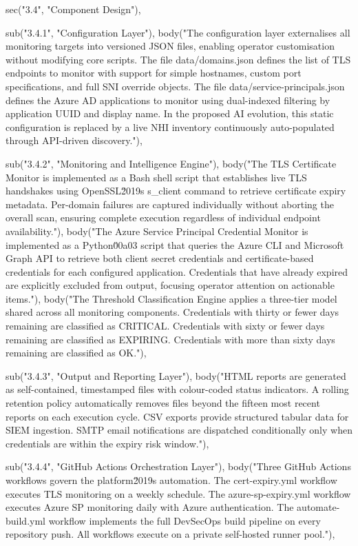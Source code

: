   sec("3.4", "Component Design"),

  sub("3.4.1", "Configuration Layer"),
  body("The configuration layer externalises all monitoring targets into versioned JSON files, enabling operator customisation without modifying core scripts. The file data/domains.json defines the list of TLS endpoints to monitor with support for simple hostnames, custom port specifications, and full SNI override objects. The file data/service-principals.json defines the Azure AD applications to monitor using dual-indexed filtering by application UUID and display name. In the proposed AI evolution, this static configuration is replaced by a live NHI inventory continuously auto-populated through API-driven discovery."),

  sub("3.4.2", "Monitoring and Intelligence Engine"),
  body("The TLS Certificate Monitor is implemented as a Bash shell script that establishes live TLS handshakes using OpenSSL\u2019s s_client command to retrieve certificate expiry metadata. Per-domain failures are captured individually without aborting the overall scan, ensuring complete execution regardless of individual endpoint availability."),
  body("The Azure Service Principal Credential Monitor is implemented as a Python\u00a03 script that queries the Azure CLI and Microsoft Graph API to retrieve both client secret credentials and certificate-based credentials for each configured application. Credentials that have already expired are explicitly excluded from output, focusing operator attention on actionable items."),
  body("The Threshold Classification Engine applies a three-tier model shared across all monitoring components. Credentials with thirty or fewer days remaining are classified as CRITICAL. Credentials with sixty or fewer days remaining are classified as EXPIRING. Credentials with more than sixty days remaining are classified as OK."),

  sub("3.4.3", "Output and Reporting Layer"),
  body("HTML reports are generated as self-contained, timestamped files with colour-coded status indicators. A rolling retention policy automatically removes files beyond the fifteen most recent reports on each execution cycle. CSV exports provide structured tabular data for SIEM ingestion. SMTP email notifications are dispatched conditionally only when credentials are within the expiry risk window."),

  sub("3.4.4", "GitHub Actions Orchestration Layer"),
  body("Three GitHub Actions workflows govern the platform\u2019s automation. The cert-expiry.yml workflow executes TLS monitoring on a weekly schedule. The azure-sp-expiry.yml workflow executes Azure SP monitoring daily with Azure authentication. The automate-build.yml workflow implements the full DevSecOps build pipeline on every repository push. All workflows execute on a private self-hosted runner pool."),

